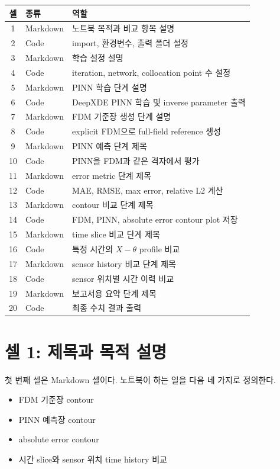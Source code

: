 \documentclass[11pt]{article}
\begin{document}
\begin{center}
\begin{tabular}{cll}
\toprule
셀 & 종류 & 역할 \\
\midrule
1 & Markdown & 노트북 목적과 비교 항목 설명 \\
2 & Code & import, 환경변수, 출력 폴더 설정 \\
3 & Markdown & 학습 설정 설명 \\
4 & Code & iteration, network, collocation point 수 설정 \\
5 & Markdown & PINN 학습 단계 설명 \\
6 & Code & DeepXDE PINN 학습 및 inverse parameter 출력 \\
7 & Markdown & FDM 기준장 생성 단계 설명 \\
8 & Code & explicit FDM으로 full-field reference 생성 \\
9 & Markdown & PINN 예측 단계 제목 \\
10 & Code & PINN을 FDM과 같은 격자에서 평가 \\
11 & Markdown & error metric 단계 제목 \\
12 & Code & MAE, RMSE, max error, relative L2 계산 \\
13 & Markdown & contour 비교 단계 제목 \\
14 & Code & FDM, PINN, absolute error contour plot 저장 \\
15 & Markdown & time slice 비교 단계 제목 \\
16 & Code & 특정 시간의 \(X-\theta\) profile 비교 \\
17 & Markdown & sensor history 비교 단계 제목 \\
18 & Code & sensor 위치별 시간 이력 비교 \\
19 & Markdown & 보고서용 요약 단계 제목 \\
20 & Code & 최종 수치 결과 출력 \\
\bottomrule
\end{tabular}
\end{center}

\section{셀 1: 제목과 목적 설명}

첫 번째 셀은 Markdown 셀이다.
노트북이 하는 일을 다음 네 가지로 정의한다.

\begin{itemize}[leftmargin=*]
    \item FDM 기준장 contour
    \item PINN 예측장 contour
    \item absolute error contour
    \item 시간 slice와 sensor 위치 time history 비교
\end{itemize}
\end{document}
